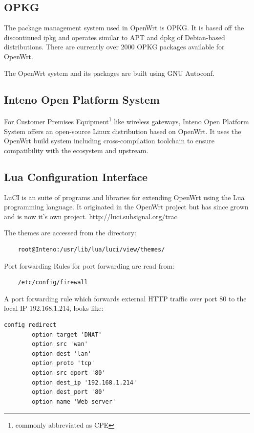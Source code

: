 \documentclass[a4paper,11pt]{kth-mag}
\begin{document}
\subsection{OPKG}
The package management system used in OpenWrt is OPKG. It is based off the
discontinued ipkg and operates similar to APT and dpkg of Debian-based
distributions. There are currently over 2000 OPKG packages available for
OpenWrt.

The OpenWrt system and its packages are built using GNU Autoconf.

\subsection{Inteno Open Platform System}
For Customer Premises Equipment\footnote{commonly abbreviated as CPE} like wireless
gateways, Inteno Open Platform System offers an open-source Linux distribution based
on OpenWrt. It uses the OpenWrt build system including cross-compilation
toolchain to ensure compatibility with the ecosystem and upstream.

\subsection{Lua Configuration Interface}
LuCI is an suite of programs and libraries for extending OpenWrt using the Lua
programming language. It originated in the OpenWrt project but has since grown
and is now it's own project.
http://luci.subsignal.org/trac

The themes are accessed from the directory:

\begin{verbatim}
    root@Inteno:/usr/lib/lua/luci/view/themes/
\end{verbatim}

Port forwarding
Rules for port forwarding are read from:

\begin{verbatim}
    /etc/config/firewall
\end{verbatim}

A port forwarding rule which forwards external HTTP traffic over port 80 to the
local IP 192.168.1.214, looks like:

\begin{verbatim}
config redirect               
        option target 'DNAT' 
        option src 'wan'
        option dest 'lan'
        option proto 'tcp'
        option src_dport '80'
        option dest_ip '192.168.1.214'
        option dest_port '80' 
        option name 'Web server'
\end{verbatim}
\end{document}

